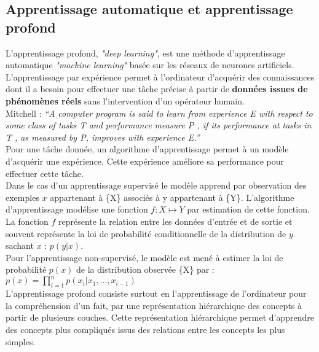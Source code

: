 \subsection{Apprentissage automatique et apprentissage profond}
L'apprentissage profond, \textit{"deep learning"}, est une méthode d'apprentissage automatique \textit{"machine learning"} basée sur les réseaux de neurones artificiels. L'apprentissage par expérience permet à l'ordinateur d'acquérir des connaissances dont il a besoin pour effectuer une tâche précise à partir de \textbf{données issues de phénomènes réels} sans l'intervention d'un opérateur humain.\\
\smallskip
Mitchell \cite{mitchell1997machine} : \textit{“A computer program is said to learn from experience E with respect to some class of tasks T and performance measure P , if its performance at tasks in T , as measured by P, improves with experience E.”}
\smallskip \\
Pour une tâche donnée, un algorithme d'apprentissage permet à un modèle d'acquérir une expérience. Cette expérience améliore sa performance pour effectuer cette tâche.\\
Dans le cas d'un apprentissage supervisé le modèle apprend par observation des exemples $x$ appartenant à  \{X\} associés à y appartenant à \{Y\}. L'algorithme d'apprentissage modélise une fonction $ f:X \mapsto Y$ par estimation de cette fonction. La fonction $f$ représente la relation entre les données d'entrée et de sortie et souvent représente la loi de probabilité conditionnelle de la distribution de $y$ sachant $x$ : $p(y|x)$.\\
Pour l'apprentissage non-supervisé, le modèle est mené à estimer la loi de probabilité $p(x)$ de la distribution  observée \{X\} par :
$p(x)= \prod_{i=1}^{n} p(x_{i}|x_{1},...,x_{i-1})$\\
\smallskip
\qquad L'apprentissage profond consiste surtout en l'apprentissage de l'ordinateur pour la compréhension d'un fait, par une représentation hiérarchique des concepts à partir de plusieurs couches. Cette représentation hiérarchique permet d'apprendre des concepts plus compliqués issus des relations entre les concepts les plus simples.

